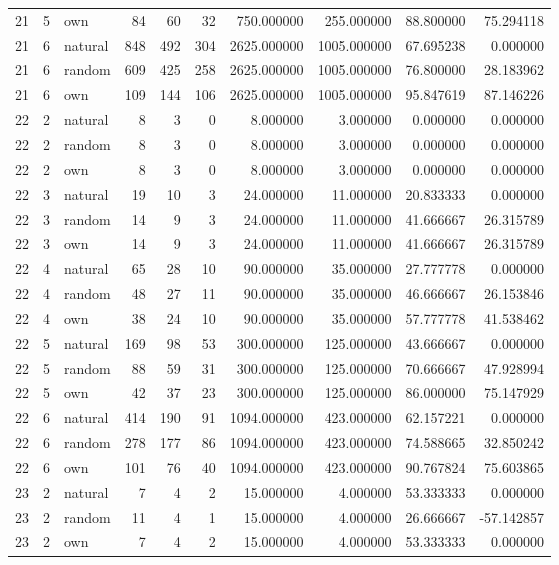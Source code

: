 \begin{table}[htbp]
\begin{tabular}{rrlrrrrrrr}
21 & 5 & own & 84 & 60 & 32 & 750.000000 & 255.000000 & 88.800000 & 75.294118 \\
21 & 6 & natural & 848 & 492 & 304 & 2625.000000 & 1005.000000 & 67.695238 & 0.000000 \\
21 & 6 & random & 609 & 425 & 258 & 2625.000000 & 1005.000000 & 76.800000 & 28.183962 \\
21 & 6 & own & 109 & 144 & 106 & 2625.000000 & 1005.000000 & 95.847619 & 87.146226 \\
22 & 2 & natural & 8 & 3 & 0 & 8.000000 & 3.000000 & 0.000000 & 0.000000 \\
22 & 2 & random & 8 & 3 & 0 & 8.000000 & 3.000000 & 0.000000 & 0.000000 \\
22 & 2 & own & 8 & 3 & 0 & 8.000000 & 3.000000 & 0.000000 & 0.000000 \\
22 & 3 & natural & 19 & 10 & 3 & 24.000000 & 11.000000 & 20.833333 & 0.000000 \\
22 & 3 & random & 14 & 9 & 3 & 24.000000 & 11.000000 & 41.666667 & 26.315789 \\
22 & 3 & own & 14 & 9 & 3 & 24.000000 & 11.000000 & 41.666667 & 26.315789 \\
22 & 4 & natural & 65 & 28 & 10 & 90.000000 & 35.000000 & 27.777778 & 0.000000 \\
22 & 4 & random & 48 & 27 & 11 & 90.000000 & 35.000000 & 46.666667 & 26.153846 \\
22 & 4 & own & 38 & 24 & 10 & 90.000000 & 35.000000 & 57.777778 & 41.538462 \\
22 & 5 & natural & 169 & 98 & 53 & 300.000000 & 125.000000 & 43.666667 & 0.000000 \\
22 & 5 & random & 88 & 59 & 31 & 300.000000 & 125.000000 & 70.666667 & 47.928994 \\
22 & 5 & own & 42 & 37 & 23 & 300.000000 & 125.000000 & 86.000000 & 75.147929 \\
22 & 6 & natural & 414 & 190 & 91 & 1094.000000 & 423.000000 & 62.157221 & 0.000000 \\
22 & 6 & random & 278 & 177 & 86 & 1094.000000 & 423.000000 & 74.588665 & 32.850242 \\
22 & 6 & own & 101 & 76 & 40 & 1094.000000 & 423.000000 & 90.767824 & 75.603865 \\
23 & 2 & natural & 7 & 4 & 2 & 15.000000 & 4.000000 & 53.333333 & 0.000000 \\
23 & 2 & random & 11 & 4 & 1 & 15.000000 & 4.000000 & 26.666667 & -57.142857 \\
23 & 2 & own & 7 & 4 & 2 & 15.000000 & 4.000000 & 53.333333 & 0.000000 \\

\end{tabular}
\end{table}
